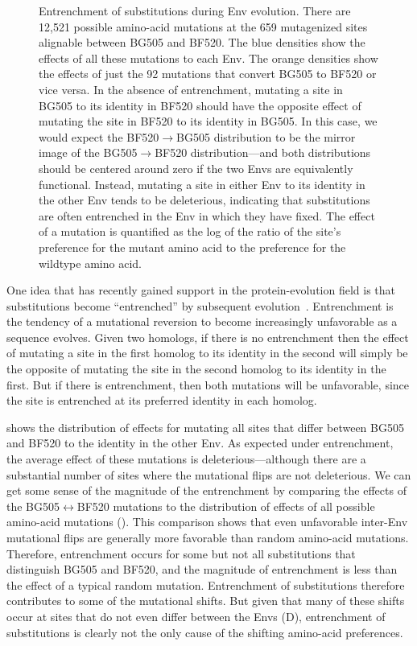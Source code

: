 \documentclass[9pt]{elife}
\begin{document}
\begin{figure}
\caption{\label{fig:entrenchment}
Entrenchment of substitutions during Env evolution.
There are 12,521 possible amino-acid mutations at the 659 mutagenized sites alignable between BG505 and BF520.
The blue densities show the effects of all these mutations to each Env.
The orange densities show the effects of just the 92 mutations that convert BG505 to BF520 or vice versa.
In the absence of entrenchment, mutating a site in BG505 to its identity in BF520 should have the opposite effect of mutating the site in BF520 to its identity in BG505.
In this case, we would expect the BF520$\rightarrow$BG505 distribution to be the mirror image of the BG505$\rightarrow$BF520 distribution---and both distributions should be centered around zero if the two Envs are equivalently functional.
Instead, mutating a site in either Env to its identity in the other Env tends to be deleterious, indicating that substitutions are often entrenched in the Env in which they have fixed.
The effect of a mutation is quantified as the log of the ratio of the site's preference for the mutant amino acid to the preference for the wildtype amino acid.
}
\end{figure}

One idea that has recently gained support in the protein-evolution field is that substitutions become ``entrenched'' by subsequent evolution~\citep{pollock2012amino,shah2015contingency,starr2017pervasive}.
Entrenchment is the tendency of a mutational reversion to become increasingly unfavorable as a sequence evolves.
Given two homologs, if there is no entrenchment then the effect of mutating a site in the first homolog to its identity in the second will simply be the opposite of mutating the site in the second homolog to its identity in the first.
But if there is entrenchment, then both mutations will be unfavorable, since the site is entrenched at its preferred identity in each homolog.

 shows the distribution of effects for mutating all sites that differ between BG505 and BF520 to the identity in the other Env.
As expected under entrenchment, the average effect of these mutations is deleterious---although there are a substantial number of sites where the mutational flips are not deleterious. 
We can get some sense of the magnitude of the entrenchment by comparing the effects of the BG505$\leftrightarrow$BF520 mutations to the distribution of effects of all possible amino-acid mutations ().
This comparison shows that even unfavorable inter-Env mutational flips are generally more favorable than random amino-acid mutations.
Therefore, entrenchment occurs for some but not all substitutions that distinguish BG505 and BF520, and the magnitude of entrenchment is less than the effect of a typical random mutation.
Entrenchment of substitutions therefore contributes to some of the mutational shifts.
But given that many of these shifts occur at sites that do not even differ between the Envs (D), entrenchment of substitutions is clearly not the only cause of the shifting amino-acid preferences.
\end{document}
